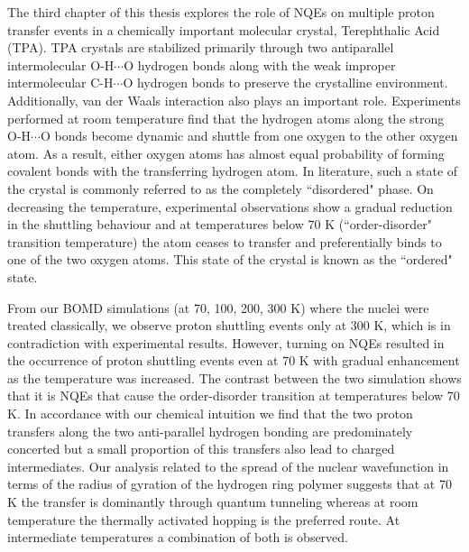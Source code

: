 \noindent The third chapter of this thesis explores the role of NQEs on multiple proton transfer events in a chemically important molecular crystal, Terephthalic Acid (TPA). TPA crystals are stabilized primarily through two antiparallel intermolecular O-H$\cdots$O hydrogen bonds along with the weak improper intermolecular C-H$\cdots$O hydrogen bonds to preserve the crystalline environment. Additionally, van der Waals interaction also plays an important role. Experiments performed at room temperature\cite{meier1986structure} find that the hydrogen atoms along the strong O-H$\cdots$O bonds become dynamic and shuttle from one oxygen to the other oxygen atom. As a result, either oxygen atoms has almost equal probability of forming covalent bonds with the transferring hydrogen atom. In literature, such a state of the crystal is commonly referred to as the completely ``disordered" phase. On decreasing the temperature, experimental observations show a gradual reduction in the shuttling behaviour and at temperatures below 70 K (``order-disorder" transition temperature) the atom ceases to transfer and preferentially binds to one of the two oxygen atoms. This state of the crystal is known as the ``ordered" state.  

\noindent From our BOMD simulations (at 70, 100, 200, 300 K) where the nuclei were treated classically, we observe proton shuttling events only at 300 K, which is in contradiction with experimental results. However, turning on NQEs resulted in the occurrence of proton shuttling events even at 70 K with gradual enhancement as the temperature was increased. The contrast between the two simulation shows that it is NQEs that cause the order-disorder transition at temperatures below 70 K. In accordance with our chemical intuition we find that the two proton transfers along the two anti-parallel hydrogen bonding are predominately concerted but a small proportion of this transfers also lead to charged intermediates. Our analysis related to the spread of the nuclear wavefunction in terms of the radius of gyration of the hydrogen ring polymer suggests that at 70 K the transfer is dominantly through quantum tunneling whereas at room temperature the thermally activated hopping is the preferred route. At intermediate temperatures a combination of both is observed. 

